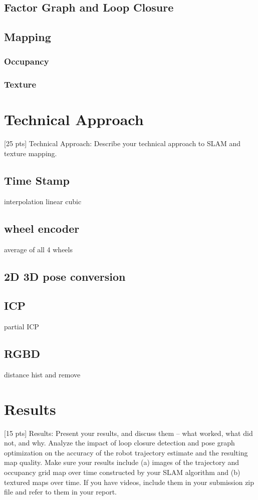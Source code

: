 \documentclass[conference]{IEEEtran}
\begin{document}
\subsection{Factor Graph and Loop Closure}

\subsection{Mapping}

\subsubsection{Occupancy}


\subsubsection{Texture}


\section{Technical Approach}
[25 pts] Technical Approach: Describe your technical approach to SLAM and texture mapping.
\subsection{Time Stamp}
interpolation 
linear 
cubic
\subsection{wheel encoder}
average of all 4 wheels
\subsection{2D 3D pose conversion}


\subsection{ICP}
partial ICP

\subsection{RGBD}
distance hist and remove


\section{Results}
[15 pts] Results: Present your results, and discuss them – what worked, what did not, and why.
Analyze the impact of loop closure detection and pose graph optimization on the accuracy of the robot
trajectory estimate and the resulting map quality. Make sure your results include (a) images of the
trajectory and occupancy grid map over time constructed by your SLAM algorithm and (b) textured
maps over time. If you have videos, include them in your submission zip file and refer to them in your
report.
\end{document}
